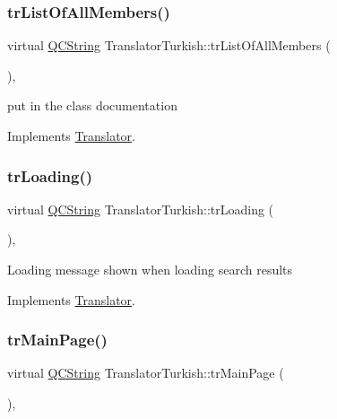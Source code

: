 \subsubsection{\texorpdfstring{trListOfAllMembers()}{trListOfAllMembers()}}
{\footnotesize\ttfamily virtual \mbox{\hyperlink{class_q_c_string}{Q\+C\+String}} Translator\+Turkish\+::tr\+List\+Of\+All\+Members (\begin{DoxyParamCaption}{ }\end{DoxyParamCaption})\hspace{0.3cm}{\ttfamily [inline]}, {\ttfamily [virtual]}}

put in the class documentation 

Implements \mbox{\hyperlink{class_translator}{Translator}}.

\mbox{\label{class_translator_turkish_a898a1a94072a02847448fb48ef8bc9ca}} 
\subsubsection{\texorpdfstring{trLoading()}{trLoading()}}
{\footnotesize\ttfamily virtual \mbox{\hyperlink{class_q_c_string}{Q\+C\+String}} Translator\+Turkish\+::tr\+Loading (\begin{DoxyParamCaption}{ }\end{DoxyParamCaption})\hspace{0.3cm}{\ttfamily [inline]}, {\ttfamily [virtual]}}

Loading message shown when loading search results 

Implements \mbox{\hyperlink{class_translator}{Translator}}.

\mbox{\label{class_translator_turkish_a0d3ebf29787a87efeef8e00a2a234e91}} 
\subsubsection{\texorpdfstring{trMainPage()}{trMainPage()}}
{\footnotesize\ttfamily virtual \mbox{\hyperlink{class_q_c_string}{Q\+C\+String}} Translator\+Turkish\+::tr\+Main\+Page (\begin{DoxyParamCaption}{ }\end{DoxyParamCaption})\hspace{0.3cm}{\ttfamily [inline]}, {\ttfamily [virtual]}}

